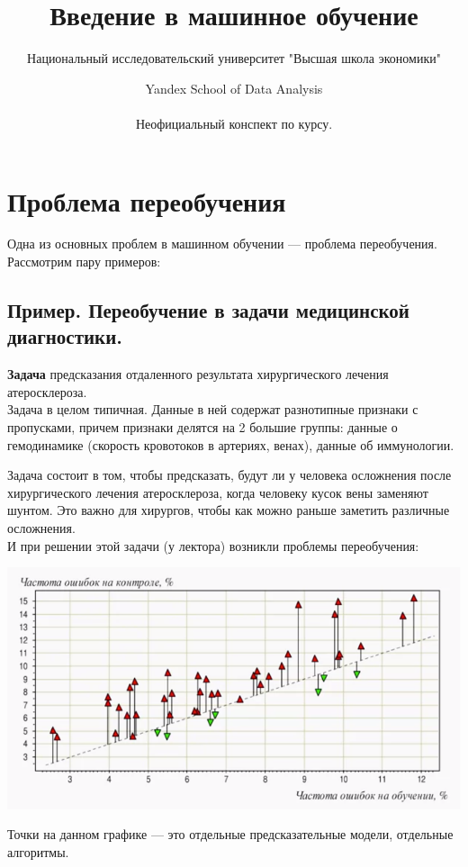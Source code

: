 \documentclass{article}
\title{Введение в машинное обучение}
\author{Национальный исследовательский университет "Высшая школа экономики" \and Yandex School of Data Analysis\\\\
Неофициальный конспект по курсу.}
\begin{document}
\maketitle

\section{Проблема переобучения}

Одна из основных проблем в машинном обучении --- проблема переобучения. Рассмотрим пару примеров:

\subsection{Пример. Переобучение в задачи медицинской диагностики.}

\textbf{Задача} предсказания отдаленного результата хирургического лечения атеросклероза.
\\

Задача в целом типичная. Данные в ней содержат разнотипные признаки с пропусками, причем признаки делятся на 2 большие группы: данные о гемодинамике (скорость кровотоков в артериях, венах), данные об иммунологии. 

Задача состоит в том, чтобы предсказать, будут ли у человека осложнения после хирургического лечения атеросклероза, когда человеку кусок вены заменяют шунтом. Это важно для хирургов, чтобы как можно раньше заметить различные осложнения.
\\

И при решении этой задачи (у лектора) возникли проблемы переобучения:

\begin{center}
    \includegraphics[scale=0.6]{2_1.png}
\end{center}

Точки на данном графике --- это отдельные предсказательные модели, отдельные алгоритмы.
\end{document}
